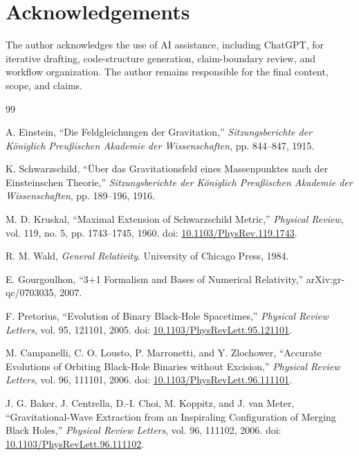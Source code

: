 \documentclass[11pt,a4paper]{article}
\begin{document}
\section*{Acknowledgements}

The author acknowledges the use of AI assistance, including ChatGPT, for iterative drafting, code-structure generation, claim-boundary review, and workflow organization. The author remains responsible for the final content, scope, and claims.

\begin{thebibliography}{99}

A. Einstein, ``Die Feldgleichungen der Gravitation,'' \emph{Sitzungsberichte der Königlich Preußischen Akademie der Wissenschaften}, pp. 844--847, 1915.

K. Schwarzschild, ``Über das Gravitationsfeld eines Massenpunktes nach der Einsteinschen Theorie,'' \emph{Sitzungsberichte der Königlich Preußischen Akademie der Wissenschaften}, pp. 189--196, 1916.

M. D. Kruskal, ``Maximal Extension of Schwarzschild Metric,'' \emph{Physical Review}, vol. 119, no. 5, pp. 1743--1745, 1960. doi: \href{https://doi.org/10.1103/PhysRev.119.1743}{10.1103/PhysRev.119.1743}.

R. M. Wald, \emph{General Relativity}. University of Chicago Press, 1984.

E. Gourgoulhon, ``3+1 Formalism and Bases of Numerical Relativity,'' arXiv:gr-qc/0703035, 2007.

F. Pretorius, ``Evolution of Binary Black-Hole Spacetimes,'' \emph{Physical Review Letters}, vol. 95, 121101, 2005. doi: \href{https://doi.org/10.1103/PhysRevLett.95.121101}{10.1103/PhysRevLett.95.121101}.

M. Campanelli, C. O. Lousto, P. Marronetti, and Y. Zlochower, ``Accurate Evolutions of Orbiting Black-Hole Binaries without Excision,'' \emph{Physical Review Letters}, vol. 96, 111101, 2006. doi: \href{https://doi.org/10.1103/PhysRevLett.96.111101}{10.1103/PhysRevLett.96.111101}.

J. G. Baker, J. Centrella, D.-I. Choi, M. Koppitz, and J. van Meter, ``Gravitational-Wave Extraction from an Inspiraling Configuration of Merging Black Holes,'' \emph{Physical Review Letters}, vol. 96, 111102, 2006. doi: \href{https://doi.org/10.1103/PhysRevLett.96.111102}{10.1103/PhysRevLett.96.111102}.


\end{thebibliography}
\end{document}
